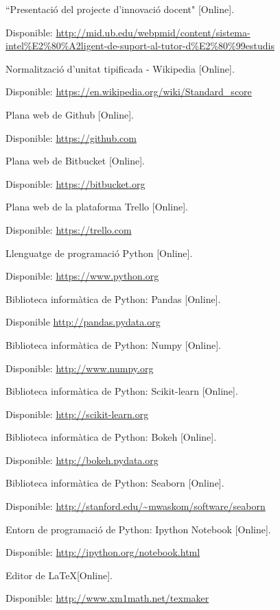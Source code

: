 \documentclass[12pt,a4paper,catalan]{article}
\begin{document}
\begin{thebibliography}{9}
``Presentació del projecte d'innovació docent" [Online]. 

Disponible: \url{http://mid.ub.edu/webpmid/content/sistema-intel\%E2\%80\%A2ligent-de-suport-al-tutor-d\%E2\%80\%99estudis}


Normalització d'unitat tipificada - Wikipedia [Online].

Disponible: \url{https://en.wikipedia.org/wiki/Standard_score}


Plana web de Github [Online].

Disponible: \url{https://github.com}


Plana web de Bitbucket [Online].

Disponible: \url{https://bitbucket.org}


Plana web de la plataforma Trello [Online].

Disponible: \url {https://trello.com}


Llenguatge de programació Python [Online].

Disponible: \url{https://www.python.org}


Biblioteca informàtica de Python: Pandas [Online].

Disponible \url{http://pandas.pydata.org}


Biblioteca informàtica de Python: Numpy [Online].

Disponible: \url{http://www.numpy.org}


Biblioteca informàtica de Python: Scikit-learn [Online].

Disponible: \url{http://scikit-learn.org}


Biblioteca informàtica de Python: Bokeh [Online].

Disponible: \url{http://bokeh.pydata.org}


Biblioteca informàtica de Python: Seaborn [Online].

Disponible: \url{http://stanford.edu/~mwaskom/software/seaborn}


Entorn de programació de Python: Ipython Notebook [Online].

Disponible: \url{http://ipython.org/notebook.html}

Editor de \LaTeX [Online].

Disponible: \url{http://www.xm1math.net/texmaker}



\end{thebibliography}
\end{document}

